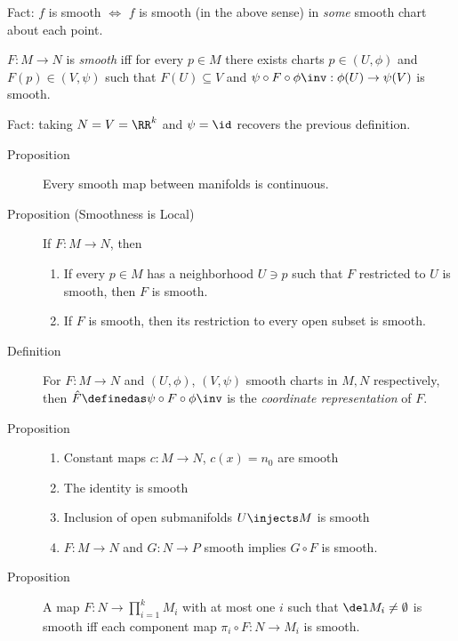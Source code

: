 Fact: \(f\) is smooth \(\iff\) \(f\) is smooth (in the above sense) in
\emph{some} smooth chart about each point.

\begin{description}
\tightlist
\item[Definition (Smooth Maps Between Manifolds)]
\(F:M\to N\) is \emph{smooth} iff for every \(p\in M\) there exists
charts \(p\in (U, \phi)\) and \(F(p) \in (V, \psi)\) such that
\(F(U) \subseteq V\) and
\(\psi \circ F \circ \phi\inv: \phi(U) \to \psi(V)\) is smooth.
\end{description}

Fact: taking \(N = V = \RR^k\) and \(\psi=\id\) recovers the previous
definition.

\begin{description}
\item[Proposition]
Every smooth map between manifolds is continuous.
\item[Proposition (Smoothness is Local)]
If \(F:M\to N\), then

\begin{enumerate}
\def\labelenumi{\arabic{enumi}.}
\tightlist
\item
  If every \(p\in M\) has a neighborhood \(U\ni p\) such that \(F\)
  restricted to \(U\) is smooth, then \(F\) is smooth.
\item
  If \(F\) is smooth, then its restriction to every open subset is
  smooth.
\end{enumerate}
\item[Definition]
For \(F:M\to N\) and \((U, \phi)\), \((V, \psi)\) smooth charts in
\(M, N\) respectively, then
\(\hat F \definedas \psi \circ F \circ \phi\inv\) is the
\emph{coordinate representation} of \(F\).
\item[Proposition]
\hfill

\begin{enumerate}
\def\labelenumi{\arabic{enumi}.}
\tightlist
\item
  Constant maps \(c:M\to N\), \(c(x) = n_0\) are smooth
\item
  The identity is smooth
\item
  Inclusion of open submanifolds \(U \injects M\) is smooth
\item
  \(F:M\to N\) and \(G:N\to P\) smooth implies \(G\circ F\) is smooth.
\end{enumerate}
\item[Proposition]
A map \(F:N \to \prod_{i=1}^k M_i\) with at most one \(i\) such that
\(\del M_i \neq \emptyset\) is smooth iff each component map
\(\pi_i \circ F: N\to M_i\) is smooth.
\end{description}


